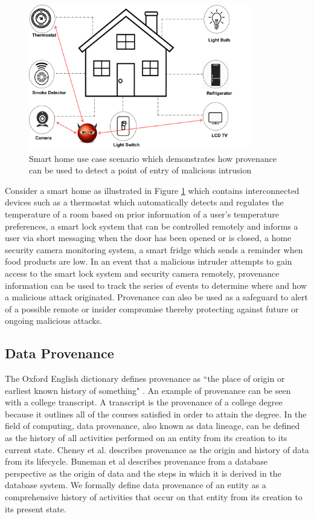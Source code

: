 \documentclass[conference]{IEEEtran}
\begin{document}
\begin{figure}[h!]
\begin{center}
\includegraphics[height=2.5in]{smart_home.png}
\end{center}
\caption{Smart home use case scenario which demonstrates how provenance can be used to detect a point of entry of malicious intrusion}
\label{smart_home}
\end{figure}



Consider a smart home as illustrated in Figure \ref{smart_home} which contains interconnected devices such as a thermostat which automatically detects and regulates the temperature of a room based on prior information of a user's temperature preferences, a smart lock system that can be controlled remotely and informs a user via short messaging when the door has been opened or is closed, a home security camera monitoring system, a smart fridge which sends a reminder when food products are low. In an event that a malicious intruder attempts  to gain access to the smart lock system and security camera remotely, provenance information can be used to track the series  of events to determine where and how a malicious attack originated. Provenance can also be used as a safeguard to alert of a possible remote or insider compromise thereby protecting against future or ongoing malicious attacks. 



\subsection{Data Provenance}

The Oxford English dictionary defines provenance as ``the place of origin or earliest
known history of something" \cite{TCDP1999}. An example of provenance can be seen with a college transcript. A transcript is the provenance of a college degree because it outlines all of the
courses satisfied in order to attain the degree. In the field of computing, data provenance, also known as data lineage, can be defined as the history of all activities performed on an entity from its creation to its current state.
Cheney et al. \cite{cheney_provenance_2009}  describes provenance as the origin and history of data from its lifecycle. Buneman et al \cite{buneman_why_2001} describes provenance from a database perspective as the origin of data and the steps in which it is derived in the database system. We formally define data provenance of an entity as a comprehensive history of activities that occur on that entity from its creation to its present state.
\end{document}
